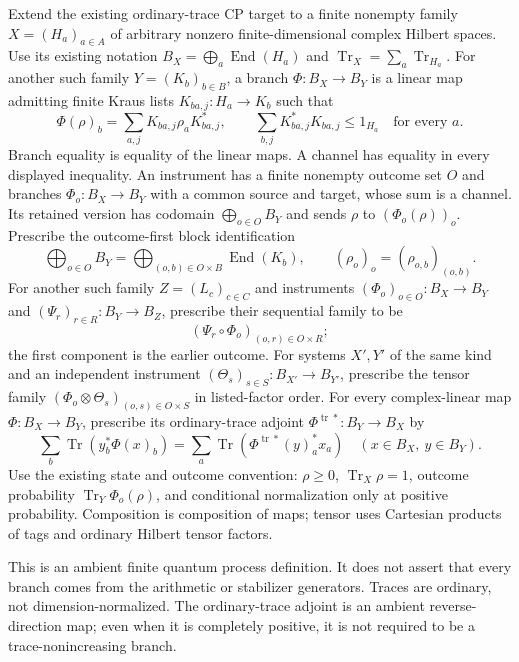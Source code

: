 \begin{definition}
Extend the existing ordinary-trace CP target to a finite nonempty family
$X=(H_a)_{a\in A}$ of arbitrary nonzero finite-dimensional complex Hilbert
spaces. Use its existing notation
$B_X=\bigoplus_a\operatorname{End}(H_a)$ and
$\operatorname{Tr}_X=\sum_a\operatorname{Tr}_{H_a}$.
For another such family $Y=(K_b)_{b\in B}$, a branch
$\Phi:B_X\to B_Y$ is a linear map admitting finite Kraus lists
$K_{b a,j}:H_a\to K_b$ such that
\[
 \Phi(\rho)_b=\sum_{a,j}K_{b a,j}\rho_aK_{b a,j}^*,\qquad
 \sum_{b,j}K_{b a,j}^*K_{b a,j}\leq1_{H_a}\quad\text{for every }a.
\]
Branch equality is equality of the linear maps. A channel has equality
in every displayed inequality. An instrument has a finite nonempty outcome
set $O$ and branches $\Phi_o:B_X\to B_Y$ with a common source and target,
whose sum is a channel. Its retained version has codomain
$\bigoplus_{o\in O}B_Y$ and sends $\rho$ to $(\Phi_o(\rho))_o$.
Prescribe the outcome-first block identification
\[
 \bigoplus_{o\in O}B_Y
 =\bigoplus_{(o,b)\in O\times B}\operatorname{End}(K_b),
 \qquad (\rho_o)_o=(\rho_{o,b})_{(o,b)}.
\]
For another such family $Z=(L_c)_{c\in C}$ and instruments
$(\Phi_o)_{o\in O}:B_X\to B_Y$ and
$(\Psi_r)_{r\in R}:B_Y\to B_Z$, prescribe their sequential family to be
\[
 (\Psi_r\circ\Phi_o)_{(o,r)\in O\times R};
\]
the first component is the earlier outcome. For systems $X',Y'$ of the
same kind and an independent instrument
$(\Theta_s)_{s\in S}:B_{X'}\to B_{Y'}$, prescribe the tensor family
$(\Phi_o\otimes\Theta_s)_{(o,s)\in O\times S}$ in listed-factor order.
For every complex-linear map $\Phi:B_X\to B_Y$, prescribe its
ordinary-trace adjoint $\Phi^{\operatorname{tr}*}:B_Y\to B_X$ by
\[
 \sum_b\operatorname{Tr}\!\left(y_b^*\Phi(x)_b\right)
 =\sum_a\operatorname{Tr}\!\left(
   \Phi^{\operatorname{tr}*}(y)_a^*x_a\right)
 \quad(x\in B_X,\ y\in B_Y).
\]
Use the existing state and outcome convention: $\rho\geq0$,
$\operatorname{Tr}_X\rho=1$, outcome probability
$\operatorname{Tr}_Y\Phi_o(\rho)$, and conditional normalization only at
positive probability. Composition is composition of maps; tensor uses
Cartesian products of tags and ordinary Hilbert tensor factors.
\end{definition}
\begin{scope}
This is an ambient finite quantum process definition. It does not assert that every branch comes from the arithmetic or stabilizer generators. Traces are ordinary, not dimension-normalized. The ordinary-trace adjoint is an ambient reverse-direction map; even when it is completely positive, it is not required to be a trace-nonincreasing branch.
\end{scope}

